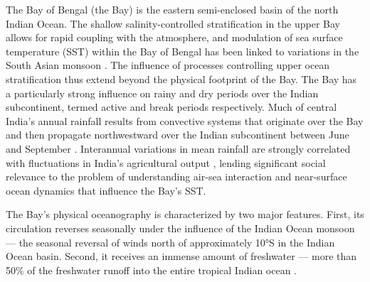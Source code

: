 \documentclass[onecol]{ametsoc}
\begin{document}
The Bay of Bengal (the Bay) is the eastern semi-enclosed basin of the north Indian Ocean. 
The shallow salinity-controlled stratification in the upper Bay allows for rapid coupling with the atmosphere, and modulation of sea surface temperature (SST) within the Bay of Bengal has been linked to variations in the South Asian monsoon \citep[e.g.,][]{Vecchi2002,Roxy2014}. 
The influence of processes controlling upper ocean stratification thus extend beyond the physical footprint of the Bay. 
The Bay has a particularly strong influence on rainy and dry periods over the Indian subcontinent, termed active and break periods respectively.
Much of central India's annual rainfall results from convective systems that originate over the Bay and then propagate northwestward over the Indian subcontinent between June and September \citep{Gadgil2003a,Goswami2003}.
Interannual variations in mean rainfall are strongly correlated with fluctuations in India's agricultural output \citep{Gadgil2006}, lending significant social relevance to the problem of understanding air-sea interaction and near-surface ocean dynamics that influence the Bay's SST.


The Bay's physical oceanography is characterized by two major features.
First, its circulation reverses seasonally under the influence of the Indian Ocean monsoon --- the seasonal reversal of winds north of approximately 10°S in the Indian Ocean basin.
Second, it receives an immense amount of freshwater --- more than 50\% of the freshwater runoff into the entire tropical Indian ocean \citep{Sengupta2006,Gordon2016}.
\end{document}
